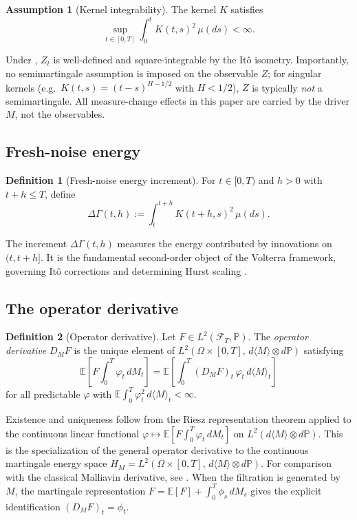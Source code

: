 \documentclass[11pt]{article}
\theoremstyle{plain}
\theoremstyle{definition}
\newtheorem{definition}{Definition}[section]
\newtheorem{assumption}{Assumption}[section]
\theoremstyle{remark}
\newcommand{\E}{\mathbb{E}}
\newcommand{\F}{\mathcal{F}}
\newcommand{\PP}{\mathbb{P}}
\newcommand{\dGamma}{\Delta\Gamma}
\newcommand{\bracket}[1]{\langle #1 \rangle}
\begin{document}
\begin{assumption}[Kernel integrability]\label{ass:kernel}
The kernel $K$ satisfies
\[
\sup_{t \in [0,T]} \int_0^t K(t,s)^2\,\mu(ds) < \infty.
\]
\end{assumption}

Under , $Z_t$ is well-defined and square-integrable by the
It\^o isometry. Importantly, no semimartingale assumption is imposed on the
observable $Z$; for singular kernels (e.g.\ $K(t,s) = (t-s)^{H-1/2}$ with
$H < 1/2$), $Z$ is typically \emph{not} a semimartingale. All
measure-change effects in this paper are carried by the driver $M$, not
the observables.

\subsection{Fresh-noise energy}

\begin{definition}[Fresh-noise energy increment]\label{def:DeltaGamma}
For $t \in [0,T)$ and $h > 0$ with $t + h \le T$, define
\[
\dGamma(t,h) := \int_t^{t+h} K(t+h,s)^2\,\mu(ds).
\]
\end{definition}

The increment $\dGamma(t,h)$ measures the energy contributed by innovations
on $(t, t+h]$. It is the fundamental second-order object of the Volterra
framework, governing It\^o corrections and determining Hurst scaling
\cite{Fontes2026f}.

\subsection{The operator derivative}

\begin{definition}[Operator derivative]\label{def:DM}
Let $F \in L^2(\F_T, \PP)$. The \emph{operator derivative} $D_M F$ is the
unique element of $L^2(\Omega \times [0,T],\, d\bracket{M} \otimes d\PP)$ satisfying
\begin{equation}\label{eq:DM-riesz}
\E\!\left[F \int_0^T \varphi_t\,dM_t\right]
= \E\!\left[\int_0^T (D_M F)_t\,\varphi_t\,d\bracket{M}_t\right]
\end{equation}
for all predictable $\varphi$ with $\E\int_0^T \varphi_t^2\,d\bracket{M}_t < \infty$.
\end{definition}

Existence and uniqueness follow from the Riesz representation theorem applied
to the continuous linear functional
$\varphi \mapsto \E[F \int_0^T \varphi_t\,dM_t]$ on $L^2(d\bracket{M} \otimes d\PP)$.
This is the specialization of the general operator derivative \cite{Fontes2026d}
to the continuous martingale energy space $H_M = L^2(\Omega \times [0,T],\, d\bracket{M} \otimes d\PP)$.
For comparison with the classical Malliavin derivative, see \cite{Nualart2006}.
When the filtration is generated by $M$, the martingale representation
$F = \E[F] + \int_0^T \phi_s\,dM_s$ gives the explicit identification
$(D_M F)_t = \phi_t$.
\end{document}

